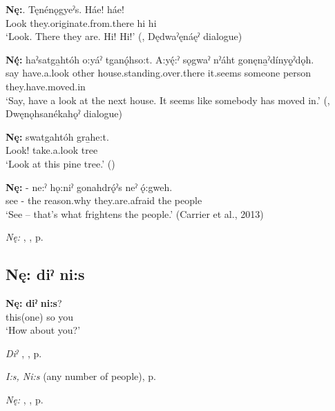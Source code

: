 \ea
\label{ex:npar101}
\gll \textbf{Nę:}. Tęnénǫgyeˀs. Háe! háe! \\
Look they.originate.from.there hi hi\\
\glt ‘Look. There they are. Hi! Hi!’ (\cite[481]{mithun_watewayestanih_1984}, Dędwaˀęnáęˀ dialogue)
\z

\ea
\label{ex:npar102}
\gll \textbf{Nę́:} haˀsatga̱htóh o:yáˀ tganǫ́hso:t. A:yę́:ˀ sǫgwaˀ nˀáht gonęna̱ˀdínyǫ̱ˀdǫh. \\
say have.a.look other house.standing.over.there it.seems someone person they.have.moved.in\\
\glt ‘Say, have a look at the next house. It seems like somebody has moved in.’ (\cite[441]{mithun_watewayestanih_1984}, Dwęnǫhsanékahǫˀ dialogue)
\z

\ea
\label{ex:npar103}
\gll \textbf{Nę:} swatgahtóh gra̱he:t. \\
Look! take.a.look tree\\
\glt ‘Look at this pine tree.’ (\cite{carrier_legends_2013})
\z

\ea
\label{ex:npar104}
\gll \textbf{Nę:} - ne:ˀ hǫ:niˀ gonahdrǫ́ˀs neˀ ǫ́:gweh. \\
see - the reason.why they.are.afraid the people\\
\glt ‘See – that’s what frightens the people.’ (Carrier et al., 2013)
\z

\begin{CayugaRelated}
\item \textit{Nę:} , , p. \pageref{p:[nę:] ‘this, these’}
\end{CayugaRelated}

\subsection*{\textbf{Nę: diˀ ni:s} } \label{p:[nę: diˀ ni:s]}

\ea
\label{ex:npar105}
\gll \textbf{Nę:} \textbf{diˀ} \textbf{ni:s}?\\
this(one) so you\\
\glt ‘How about you?’
\z

\begin{CayugaRelated}
\item \textit{Diˀ} , , p. \pageref{p:[diˀ]}\\
\item \textit{I:s, Ni:s}  (any number of people), p. \pageref{p:[i:s]}\\
\item \textit{Nę:} , , p. \pageref{p:[nę:] ‘this, these’}
\end{CayugaRelated}

